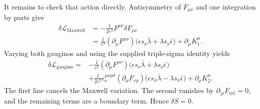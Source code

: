 \begin{enumerate}
  It remains to check that action directly.  Antisymmetry of \(F_{\mu\nu}\)
  and one integration by parts give
  \[
  \begin{aligned}
    \delta\mathcal L_{\mathrm{Maxwell}}
      &=-\frac1{2e^2}F^{\mu\nu}\delta F_{\mu\nu}\\
      &=\frac1{e^2}(\partial_\mu F^{\mu\nu})
         \bigl(\epsilon s_\nu\bar\lambda
               +\lambda s_\nu\bar\epsilon\bigr)
        +\partial_\mu K_1^\mu .
  \end{aligned}
  \]
  Varying both gauginos and using the supplied triple-sigma identity yields
  \[
  \begin{aligned}
    \delta\mathcal L_{\mathrm{gaugino}}
      ={}&-\frac1{e^2}(\partial_\mu F^{\mu\nu})
         \bigl(\epsilon s_\nu\bar\lambda
               +\lambda s_\nu\bar\epsilon\bigr)\\
       &+\frac{\ii}{2e^2}\epsilon_{\mathrm s}^{\mu\nu\rho\sigma}
          (\partial_\mu F_{\nu\rho})
          \bigl(\epsilon s_\sigma\bar\lambda
                -\lambda s_\sigma\bar\epsilon\bigr)
        +\partial_\mu K_2^\mu .
  \end{aligned}
  \]
  The first line cancels the Maxwell variation.  The second vanishes by
  \(\partial_{[\mu}F_{\nu\rho]}=0\), and the remaining terms are a boundary
  term.  Hence \(\delta S=0\).


\end{enumerate}
